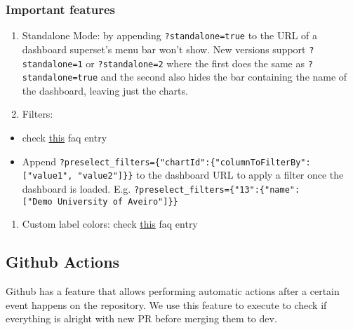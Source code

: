 \documentclass[
]{book}
\providecommand{\tightlist}{%
  \setlength{\itemsep}{0pt}\setlength{\parskip}{0pt}}
\begin{document}
\hypertarget{important-features}{%
\subsubsection*{Important features}\label{important-features}}

\begin{enumerate}
\def\labelenumi{\arabic{enumi}.}
\item
  Standalone Mode: by appending \texttt{?standalone=true} to the URL of a dashboard superset's menu bar won't show.
  New versions support \texttt{?standalone=1} or \texttt{?standalone=2} where the first does the same as \texttt{?standalone=true} and the second also hides the bar containing the name of the dashboard, leaving just the charts.
\item
  Filters:
\end{enumerate}

\begin{itemize}
\tightlist
\item
  check \href{https://superset.apache.org/docs/frequently-asked-questions\#how-to-add-dynamic-filters-to-a-dashboard}{this} faq entry
\item
  Append \texttt{?preselect\_filters=\{"chartId":\{"columnToFilterBy":{[}"value1",\ "value2"{]}\}\}} to the dashboard URL to apply a filter once the dashboard is loaded. E.g. \texttt{?preselect\_filters=\{"13":\{"name":{[}"Demo\ University\ of\ Aveiro"{]}\}\}}
\end{itemize}

\begin{enumerate}
\def\labelenumi{\arabic{enumi}.}
\setcounter{enumi}{2}
\tightlist
\item
  Custom label colors: check \href{https://superset.apache.org/docs/frequently-asked-questions\#is-there-a-way-to-force-the-use-specific-colors}{this} faq entry
\end{enumerate}

\hypertarget{github-actions}{%
\subsection*{Github Actions}\label{github-actions}}

Github has a feature that allows performing automatic actions after a certain event happens on the repository.
We use this feature to execute to check if everything is alright with new PR before merging them to dev.
\end{document}
